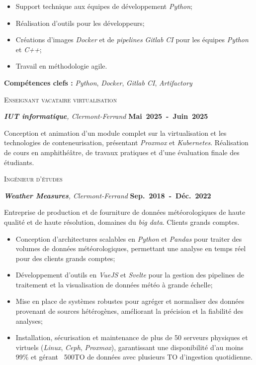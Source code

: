 \documentclass[10pt, a4paper]{article}
\newcommand{\dates}[1]{\hfill\mbox{\textbf{#1}}}
\begin{document}
\begin{minipage}[t]{0.56\textwidth}
{\begin{itemize}
    \item Support technique aux équipes de développement \emph{Python};
    \item Réalisation d'outils pour les développeurs;
    \item Créations d'images \emph{Docker} et de \emph{pipelines} \emph{Gitlab CI} pour les équipes \emph{Python} et \emph{C++};
    \item Travail en méthodologie agile.
\end{itemize}

\textbf{Compétences clefs :} \emph{Python}, \emph{Docker}, \emph{Gitlab CI}, \emph{Artifactory}
}


\medskip

\textsc{Enseignant vacataire virtualisation} 

\textit{\textbf{IUT informatique}, Clermont-Ferrand}  \dates{Mai 2025 - Juin 2025}

{\small
Conception et animation d’un module complet sur la virtualisation et les technologies de conteneurisation, présentant \emph{Proxmox} et \emph{Kubernetes}. Réalisation de cours en amphithéâtre, de travaux pratiques et d'une évaluation finale des étudiants.
}

\medskip

\textsc{Ingénieur d'études}

\textit{\textbf{Weather Measures}, Clermont-Ferrand}  \dates{Sep. 2018 - Déc. 2022}

{\small
Entreprise de production et de fourniture de données météorologiques de haute qualité et de haute résolution, domaines du \emph{big data}. Clients grands comptes.

\begin{itemize}
    \item Conception d’architectures scalables en \emph{Python} et \emph{Pandas} pour traiter des volumes de données météorologiques, permettant une analyse en temps réel pour des clients grands comptes;
    \item Développement d’outils en \emph{VueJS} et \emph{Svelte} pour la gestion des pipelines de traitement et la visualisation de données météo à grande échelle;
    \item Mise en place de systèmes robustes pour agréger et normaliser des données provenant de sources hétérogènes, améliorant la précision et la fiabilité des analyses;
    \item Installation, sécurisation et maintenance de plus de 50 serveurs physiques et virtuels (\emph{Linux}, \emph{Ceph}, \emph{Proxmox}), garantissant une disponibilité d'au moins 99\% et gérant ~500TO de données avec plusieurs TO d'ingestion quotidienne.
\end{itemize}

}
\end{minipage}
\end{document}
